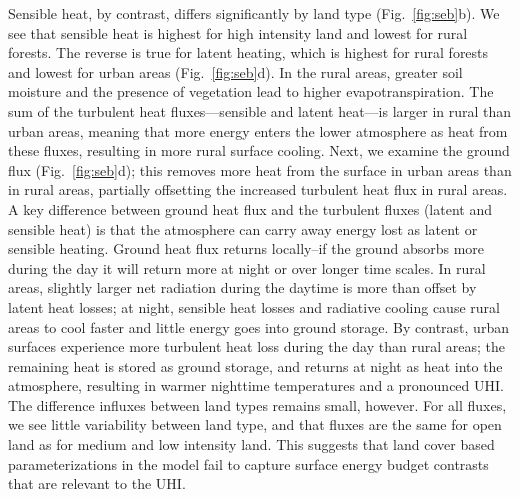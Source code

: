 Sensible heat, by contrast, differs significantly by land type (Fig.~\ref{fig:seb}b).  
We see that sensible heat is highest for high intensity land and lowest for rural forests. The reverse is true for latent heating, which is highest for rural forests and lowest for urban areas  (Fig.~\ref{fig:seb}d). 
In the rural areas, 
greater soil moisture and the presence of vegetation lead to higher evapotranspiration.
The sum of the turbulent heat fluxes---sensible and latent heat---is larger in rural than urban areas, meaning that more energy enters the lower atmosphere as heat from these fluxes, resulting in more rural surface cooling. 
Next, we examine the ground flux (Fig.~\ref{fig:seb}d); this removes more heat from the surface in urban areas than in rural areas, partially offsetting the increased turbulent heat flux in rural areas. 
A key difference between ground heat flux and the turbulent fluxes (latent and sensible heat) is that the atmosphere can carry away energy lost as latent or sensible heating.
 Ground heat flux returns locally--if the ground absorbs more during the day it will return more at night or over longer time scales.
In rural areas, slightly larger net radiation during the daytime is more than offset by latent heat losses; at night, sensible heat losses and radiative cooling cause rural areas to cool faster and little energy goes into ground storage. 
By contrast, urban surfaces experience more turbulent heat loss during the day than rural areas; the remaining heat is stored as ground storage, and returns at night as heat into the atmosphere,  resulting in warmer nighttime temperatures and a pronounced UHI. 
The difference influxes between land types remains small, however. 
For all fluxes, we see little variability between land type, and that fluxes are the same for open land as for medium and low intensity land. This suggests that land cover based parameterizations in the model fail to capture surface energy budget contrasts that are relevant to the UHI.

